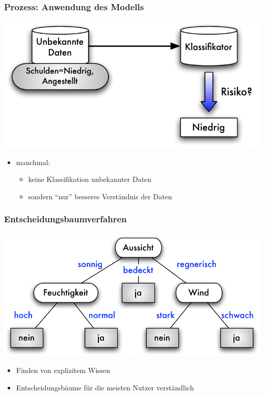 \begin{frame}
\frametitle{Prozess: Anwendung des Modells}

\begin{center}
\includegraphics[scale=.7]{fig7/klass-prinzip-anw.pdf}
\end{center}

\begin{itemize}
\item manchmal:
\begin{itemize}
\item keine Klassifikation unbekannter Daten
\item sondern "`nur"' besseres Verständnis der Daten
\end{itemize}
\end{itemize}

\end{frame}

\begin{frame}
\frametitle{Entscheidungsbaumverfahren}

\begin{center}
\includegraphics[scale=.7]{fig7/entscheidungsbaum-tennis.pdf}
\end{center}

\begin{itemize}
\item Finden von explizitem Wissen
\item Entscheidungsbäume für die meisten Nutzer verständlich
\end{itemize}

\end{frame}

